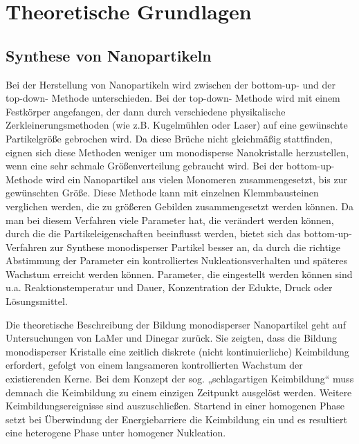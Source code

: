 \section{Theoretische Grundlagen}
\subsection{Synthese von Nanopartikeln}
	Bei der Herstellung von Nanopartikeln wird zwischen der \glqq bottom-up\grqq - und der \glqq top-down\grqq - Methode unterschieden.
	Bei der \glqq top-down\grqq - Methode wird mit einem Festkörper angefangen, der dann durch verschiedene physikalische Zerkleinerungsmethoden (wie z.B. Kugelmühlen oder Laser) auf eine gewünschte Partikelgröße gebrochen wird.
	Da diese Brüche nicht gleichmäßig stattfinden, eignen sich diese Methoden weniger um monodisperse Nanokristalle herzustellen, wenn eine sehr schmale Größenverteilung gebraucht wird.
	Bei der \glqq bottom-up\grqq - Methode wird ein Nanopartikel aus vielen Monomeren zusammengesetzt, bis zur gewünschten Größe.
	Diese Methode kann mit einzelnen Klemmbausteinen verglichen werden, die zu größeren Gebilden zusammengesetzt werden können.
	Da man bei diesem Verfahren viele Parameter hat, die verändert werden können, durch die die Partikeleigenschaften beeinflusst werden, bietet sich das \glqq bottom-up\grqq - Verfahren zur Synthese monodisperser Partikel besser an, da durch die richtige Abstimmung der Parameter ein kontrolliertes Nukleationsverhalten und späteres Wachstum erreicht werden können.
	Parameter, die eingestellt werden können sind u.a. Reaktionstemperatur und Dauer, Konzentration der Edukte, Druck oder Lösungsmittel.
	
	Die theoretische Beschreibung der Bildung monodisperser Nanopartikel geht auf Untersuchungen von LaMer und Dinegar zurück.\autocite{Lamer1950}
	Sie zeigten, dass die Bildung
	monodisperser Kristalle eine zeitlich diskrete (nicht kontinuierliche) Keimbildung
	erfordert, gefolgt von einem langsameren kontrollierten Wachstum der existierenden
	Kerne.
	Bei dem Konzept der sog. „schlagartigen Keimbildung“ muss demnach die
	Keimbildung zu einem einzigen Zeitpunkt ausgelöst werden. Weitere
	Keimbildungsereignisse sind auszuschließen. Startend in einer homogenen Phase setzt
	bei Überwindung der Energiebarriere die Keimbildung ein und es resultiert eine
	heterogene Phase unter homogener Nukleation. \autocite{Park2007}
	
